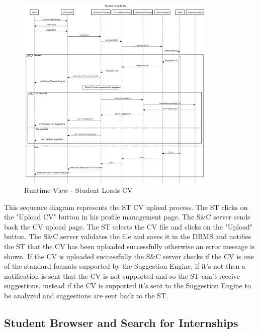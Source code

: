 \begin{figure}[H]
      \centering
      \includegraphics[width=0.85\textwidth]{Images/RV_02.pdf}
      \caption{Runtime View - Student Loads CV}
      \label{fig:rv-student-loads-cv}
\end{figure}

\par This sequence diagram represents the ST CV upload process. The ST clicks on the "Upload CV" button in his profile
management page. The S\&C server sends back the CV upload page. The ST selects the CV file and clicks on the "Upload" button.
The S\&C server validates the file and saves it in the DBMS and notifies the ST that the CV has been uploaded successfully
otherwise an error message is shown. If the CV is uploaded successfully the S\&C server checks if the CV is one of the
standard formats supported by the Suggestion Engine, if it's not then a notification is sent that the CV is not supported and
so the ST can't receive suggestions, instead if the CV is supported it's sent to the Suggestion Engine to be analyzed and
suggestions are sent back to the ST.


\subsection{Student Browser and Search for Internships}
\label{sub:student-browser-and-search-for-internships}%

